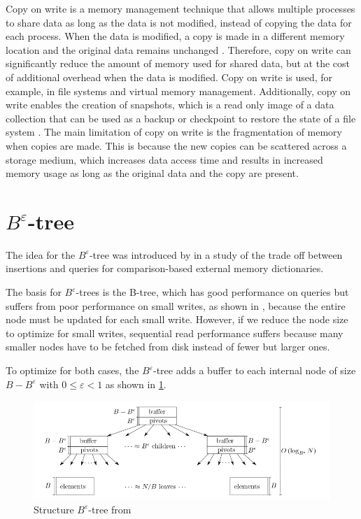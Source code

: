 \documentclass[
	12pt,
	a4paper,
	abstract,
	bibliography=totoc,
	chapterprefix,
	headings=openright,
	numbers=endperiod,
	parskip=half,
	twoside,
]{scrreprt}
\begin{document}
Copy on write is a memory management technique that allows multiple processes to 
share data as long as the data is not modified, instead of copying the data for each process. 
When the data is modified, a copy is made in a different memory location and 
the original data remains unchanged \cite{ha2022ccow}.
Therefore, copy on write can significantly reduce the amount of memory used for shared data, 
but at the cost of additional overhead when the data is modified.
Copy on write is used, for example, in file systems and virtual memory management.
Additionally, copy on write enables the creation of snapshots, which is a read only image of a 
data collection that can be used as a backup or checkpoint to restore the state of a file system \cite{peterson2002data}.
The main limitation of copy on write is the fragmentation of memory when copies are made.
This is because the new copies can be scattered across a storage medium, which increases data access time and 
results in increased memory usage as long as the original data and the copy are present.


\section{$B^{\varepsilon}$-tree}
\label{sec:tree}

The idea for the $B^{\varepsilon}$-tree was introduced by \cite{brodal2003lower} in a study of the trade off between 
insertions and queries for comparison-based external memory dictionaries.

The basis for $B^{\varepsilon}$-trees is the B-tree, which has good performance on queries but suffers 
from poor performance on small writes, as shown in \cite{bender2015introduction}, 
because the entire node must be updated for each small write.
However, if we reduce the node size to optimize for small writes, sequential read performance 
suffers because many smaller nodes have to be fetched from disk instead of fewer but larger ones.

To optimize for both cases, the $B^{\varepsilon}$-tree adds a buffer to each 
internal node of size $B - B^{\varepsilon} $ with $ 0 \leq \varepsilon < 1$ as shown 
in \cref{fig:structure B-epsilon-tree}.

\begin{figure}[ht]
	\centering
	\includegraphics[scale=0.6]{B-epsilon_structure.png}
	\caption{Structure $B^{\varepsilon}$-tree from \cite{bender2015introduction}}
		\label{fig:structure B-epsilon-tree}
\end{figure}
\end{document}
